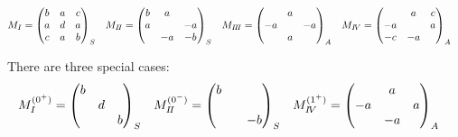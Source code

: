 \documentclass[prd,preprintnumbers,floatfix,
nofootinbib,superscriptaddress]{revtex4}
\begin{document}
\begin{align}
  M_{I}&=\begin{pmatrix}
    b & a & c\\
    a & d & a\\
    c & a & b
  \end{pmatrix}_S&
  M_{{I\!I}}&=\begin{pmatrix}
    b & a &  \\
    a &   & -a\\
      & -a & -b
  \end{pmatrix}_S&
  M_{{I\!I\!I}}&=\begin{pmatrix}
      & a &  \\
    -a &   & -a\\
      & a &
  \end{pmatrix}_A&
  M_{{I\!V}}&=\begin{pmatrix}
      & a & c\\
    -a &   & a\\
    -c & -a &
  \end{pmatrix}_A
\end{align}

There are three special cases:
\begin{align} \label{eq:matrices.spec}
  M_{I}^{(0^+)}&=\begin{pmatrix}
    b & & \\
    & d &\\
    & & b
  \end{pmatrix}_S&
  M_{{I\!I}}^{(0^-)}&=\begin{pmatrix}
    b &  &  \\
     &   & \\
      &  & -b
  \end{pmatrix}_S&
  M_{{I\!V}}^{(1^+)}&=\begin{pmatrix}
      & a & \\
    -a &   & a\\
      & -a &
  \end{pmatrix}_A
\end{align}
\end{document}
